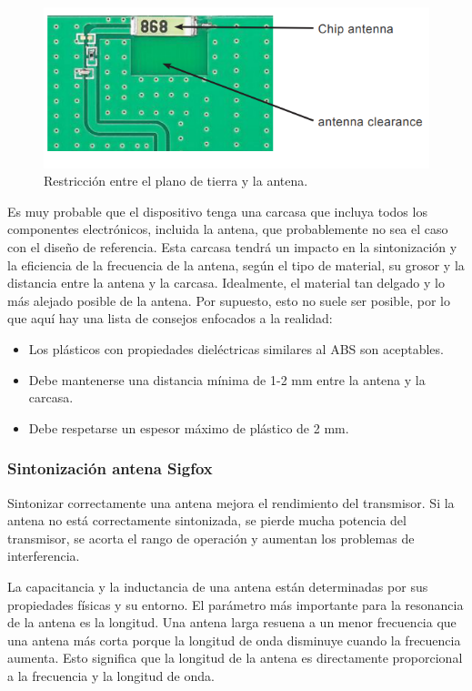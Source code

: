 \begin{figure}[h]
	\centering
	\includegraphics[scale=.35]{./Figures/chipantena.PNG}
	\caption{Restricción entre el plano de tierra y la antena.}
	\label{fig:chipantena}
\end{figure}
Es muy probable que el dispositivo tenga una carcasa que incluya todos los componentes electrónicos, incluida la antena, que probablemente no sea el caso con el diseño de referencia. Esta carcasa tendrá un impacto en la sintonización y la eficiencia de la frecuencia de la antena, según el tipo de material, su grosor y la distancia entre la antena y la carcasa. Idealmente, el material tan delgado y lo más alejado posible de la antena. Por supuesto,
esto no suele ser posible, por lo que aquí hay una lista de consejos enfocados a la realidad\citep{CertificationSigfox}:
\begin{itemize}
 \item Los plásticos con propiedades dieléctricas similares al ABS son aceptables. 
 \item Debe mantenerse una distancia mínima de 1-2 mm entre la antena y la carcasa.
 \item Debe respetarse un espesor máximo de plástico de 2 mm.
\end{itemize}

\subsubsection{Sintonización antena Sigfox} \label{subsectionSintonizar}
Sintonizar correctamente una antena mejora el rendimiento del transmisor. Si la antena no está correctamente sintonizada, se pierde mucha potencia del transmisor, se acorta el rango de operación y aumentan los problemas de interferencia.

La capacitancia y la inductancia de una antena están determinadas por sus propiedades físicas y su entorno. El parámetro más importante para la resonancia de la antena es la longitud. Una antena larga resuena a un menor frecuencia que una antena más corta porque la longitud de onda disminuye cuando la frecuencia aumenta. Esto significa que la longitud de la antena es directamente proporcional a la frecuencia y la longitud de onda\citep{NordicSemiconductor2012}.

